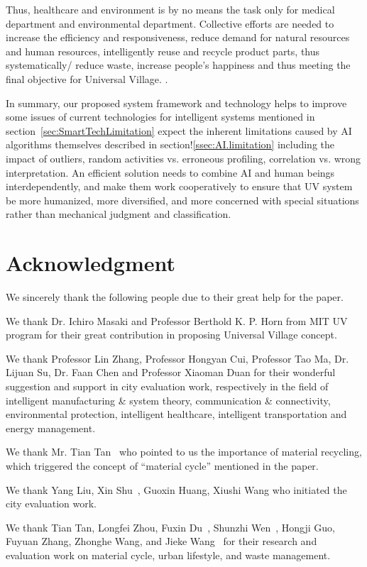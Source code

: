 \documentclass[letterpaper, twocolumn, 10pt, conference]{IEEEtran}
\begin{document}
Thus, healthcare and environment is by no means the task only for medical department and environmental department. Collective efforts are needed to increase the efficiency and responsiveness, reduce demand for natural resources and human resources, intelligently reuse and recycle product parts, thus systematically/ reduce waste, increase people’s happiness and thus meeting the final objective for Universal Village. . 

In summary, our proposed system framework and technology helps to improve some issues  of current technologies for intelligent systems mentioned in section~\ref{sec:SmartTechLimitation} expect the inherent limitations caused by AI algorithms themselves described in section!\ref{ssec:AI.limitation} including the impact of outliers, random activities vs. erroneous profiling, correlation vs. wrong interpretation. An efficient solution needs to combine AI and human beings interdependently, and make them work cooperatively to ensure that UV system be more humanized, more diversified, and more concerned with special situations rather than mechanical judgment and classification.

\section*{Acknowledgment}

We sincerely thank the following people due to their great help for the paper. 

We thank Dr. Ichiro Masaki and Professor Berthold K. P. Horn from MIT UV program for their great contribution in proposing Universal Village concept. 

We thank Professor Lin Zhang, Professor Hongyan Cui, Professor Tao Ma, Dr. Lijuan Su, Dr. Faan Chen and Professor Xiaoman Duan for their wonderful suggestion and support in city evaluation work, respectively in the field of intelligent manufacturing \& system theory, communication \& connectivity, environmental protection, intelligent healthcare, intelligent transportation and energy management. 

We thank Mr. Tian Tan~\cite{uv2018-smartenvironment-tan.tian} who pointed to us the importance of material recycling, which triggered the concept of \enquote{material cycle} mentioned in the paper. 

We thank Yang Liu, Xin Shu~\cite{uv2018-smartenvironment-shu.xin}, Guoxin Huang, Xiushi Wang who initiated the city evaluation work. 

We thank Tian Tan, Longfei Zhou, Fuxin Du~\cite{uv2018-lifestyle-du.fuxin}, Shunzhi Wen~\cite{uv2018-wastemanagement-wen.shunzhi}, Hongji Guo, Fuyuan Zhang, Zhonghe Wang, and Jieke Wang~\cite{uv2018-smartenvironment-wang.jieke} for their research and evaluation work on material cycle, urban lifestyle, and waste management. 
\end{document}
